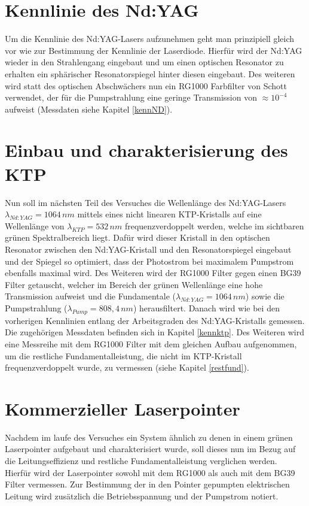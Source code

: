 \documentclass[twoside,colorback,accentcolor=tud4c,11pt]{tudreport}
\begin{document}
\section{Kennlinie des Nd:YAG}\label{v4}
Um die Kennlinie des Nd:YAG-Lasers aufzunehmen geht man prinzipiell gleich vor wie zur Bestimmung der Kennlinie der Laserdiode. Hierfür wird der Nd:YAG wieder in den Strahlengang eingebaut und um einen optischen Resonator zu erhalten ein sphärischer Resonatorspiegel hinter diesen eingebaut. Des weiteren wird statt des optischen Abschwächers nun ein RG1000 Farbfilter von Schott verwendet, der für die Pumpstrahlung eine geringe Transmission von $\approx 10^{-4}$ aufweist (Messdaten siehe Kapitel \ref{kennND}).
\section{Einbau und charakterisierung des KTP}\label{v5}
Nun soll im nächsten Teil des Versuches die Wellenlänge des Nd:YAG-Lasers $\lambda_{Nd:YAG}=1064\,\si{nm}$ mittels eines nicht linearen KTP-Kristalls auf eine Wellenlänge von $\lambda_{KTP}=532\,\si{nm}$ frequenzverdoppelt werden, welche im sichtbaren grünen Spektralbereich liegt. Dafür wird dieser Kristall in den optischen Resonator zwischen den Nd:YAG-Kristall und den Resonatorspiegel eingebaut und der Spiegel so optimiert, dass der Photostrom bei maximalem Pumpstrom ebenfalls maximal wird. Des Weiteren wird der RG1000 Filter gegen einen BG39 Filter getauscht, welcher im Bereich der grünen Wellenlänge eine hohe Transmission aufweist und die Fundamentale ($\lambda_{Nd:YAG}=1064\,\si{nm}$) sowie die Pumpstrahlung ($\lambda_{Pump}=808,4\,\si{nm}$) herausfiltert. Danach wird wie bei den vorherigen Kennlinien entlang der Arbeitsgraden des Nd:YAG-Kristalls gemessen. Die zugehörigen Messdaten befinden sich in Kapitel \ref{kennktp}.
Des Weiteren wird eine Messreihe mit dem RG1000 Filter mit dem gleichen Aufbau aufgenommen, um die restliche Fundamentalleistung, die nicht im KTP-Kristall frequenzverdoppelt wurde, zu vermessen (siehe Kapitel \ref{restfund}).
\section{Kommerzieller Laserpointer}\label{v6}
Nachdem im laufe des Versuches ein System ähnlich zu denen in einem grünen Laserpointer aufgebaut und charakterisiert wurde, soll dieses nun im Bezug auf die Leitungseffizienz und restliche Fundamentalleistung verglichen werden. Hierfür wird der Laserpointer sowohl mit dem RG1000 als auch mit dem BG39 Filter vermessen. Zur Bestimmung der in den Pointer gepumpten elektrischen Leitung wird zusätzlich die Betriebsspannung und der Pumpstrom notiert.
  
\end{document}
